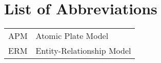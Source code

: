 \documentclass[a4paper, 11pt, titlepage]{scrartcl}
\theoremstyle{plain}
\begin{document}




\renewcommand{\baselinestretch}{1.4}\normalsize

 \setcounter{page}{2}

\renewcommand{\baselinestretch}{1.25}\normalsize

\tableofcontents

\renewcommand{\baselinestretch}{1.4}\normalsize

\newpage

\section*{List of Abbreviations}

\begin{tabular}{ll}
APM & Atomic Plate Model\\
ERM & Entity-Relationship Model
\end{tabular}

\newpage

\renewcommand{\baselinestretch}{1.5}\normalsize
{} \setcounter{page}{1}



\newpage



\newpage



\newpage



\newpage



\newpage



\newpage



\newpage



\newpage

\printbibliography
\end{document}
